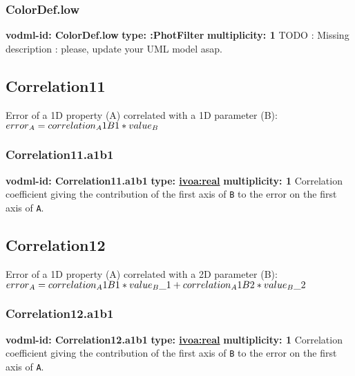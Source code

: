     \subsubsection{ColorDef.low}
      \textbf{vodml-id: ColorDef.low} \newline
      \textbf{type: :PhotFilter} \newline
      \textbf{multiplicity: 1} \newline 
      TODO : Missing description : please, update your UML model asap.

  \subsection{Correlation11}
  \label{sect:Correlation11}
    Error of a 1D property (A) correlated with a 1D parameter (B): $error\\_A = correlation\\_A1B1 * value\\_B$

    \subsubsection{Correlation11.a1b1}
      \textbf{vodml-id: Correlation11.a1b1} \newline
      \textbf{type: \hyperref[sect:ivoa]{ivoa:real}} \newline
      \textbf{multiplicity: 1} \newline 
      Correlation coefficient giving the contribution of the first axis of \texttt{B} to the error on the first axis of \texttt{A}.

  \subsection{Correlation12}
  \label{sect:Correlation12}
    Error of a 1D property (A) correlated with a 2D parameter (B): $error\\_A = correlation\\_A1B1 * value\\_B\_1 + correlation\\_A1B2 * value\\_B\_2$

    \subsubsection{Correlation12.a1b1}
      \textbf{vodml-id: Correlation12.a1b1} \newline
      \textbf{type: \hyperref[sect:ivoa]{ivoa:real}} \newline
      \textbf{multiplicity: 1} \newline 
      Correlation coefficient giving the contribution of the first axis of \texttt{B} to the error on the first axis of \texttt{A}.

